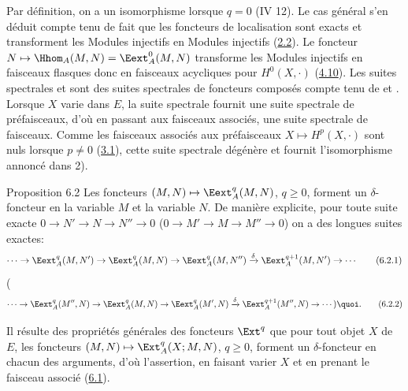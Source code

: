 Par définition, on a un isomorphisme  lorsque $q = 0$ (IV
12). Le cas général s'en déduit compte tenu de fait que les
foncteurs de localisation sont exacts et transforment les Modules
injectifs en Modules injectifs (\hyperref[V.subsec2.2]{2.2}). Le foncteur $N \mapsto
\Hhom_A(M, N) = \Eext^0_A(M, N)$ transforme les Modules
injectifs en faisceaux flasques donc en faisceaux acycliques pour
$H^{0}(X, ⋅)$ (\hyperref[V.prop4.10]{4.10}). Les suites spectrales  et 
sont des suites spectrales de foncteurs composés compte tenu de
 et . Lorsque $X$ varie dans $E$, la suite spectrale
 fournit une suite spectrale de préfaisceaux, d'où en
passant aux faisceaux associés, une suite spectrale de
faisceaux. Comme les faisceaux associés aux préfaisceaux $X
\mapsto H^p(X, ⋅)$ sont nuls lorsque $p \neq 0$ (\hyperref[V.prop3.1]{3.1}), cette suite
spectrale dégénère et fournit l'isomorphisme annoncé dans 2).

\begin{enonce*}{Proposition 6.2}
Les foncteurs $(M, N) \mapsto \Eext^q_A(M, N)$, $q \geq 0$, forment un
$\delta$-foncteur en la variable $M$ et la variable $N$. De manière
explicite, pour toute suite exacte $0 \to N' \to N \to N'' \to 0$
(\resp $0 \to M' \to M \to M'' \to 0$) on a des longues suites exactes:
\begin{equation*}
\cdots \to \Eext^q_A(M, N') \to \Eext^q_A(M, N) \to \Eext^q_A(M, N'')
\xrightarrow{\delta}\Eext^{q+1}_A(M, N') \to \cdots \tag{6.2.1}
\end{equation*}
 (\resp
\begin{equation*}
\cdots \to \Eext^q_A(M'', N) \to \Eext^q_A(M, N) \to \Eext^q_A(M', N)
\xrightarrow{\delta}\Eext^{q+1}_A(M'', N) \to \cdots ){\quoi}.\tag{6.2.2}
\end{equation*}
\end{enonce*}

Il résulte des propriétés générales des foncteurs $\Ext^q$ que pour
tout objet $X$ de $E$, les foncteurs $(M, N) \mapsto \Ext^q_A(X;M,
N)$, $q \geq 0$, forment un $\delta$-foncteur en chacun des
arguments, d'où l'assertion, en faisant varier $X$ et en prenant
le faisceau associé (\hyperref[V.prop6.1]{6.1}).

\setcounter{subsection}{2}

